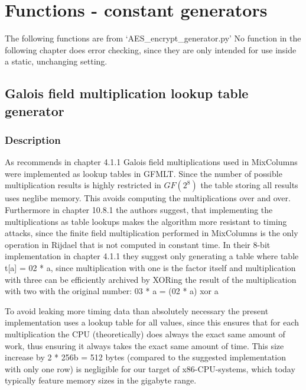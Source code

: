 
\hypertarget{functions---constant-generators}{%
\section{Functions - constant
generators}\label{functions---constant-generators}}

The following functions are from `AES\_encrypt\_generator.py' No
function in the following chapter does error checking, since they are
only intended for use inside a static, unchanging setting.

\hypertarget{galois-field-multiplication-lookup-table-generator}{%
\subsection{Galois field multiplication lookup table
generator}\label{galois-field-multiplication-lookup-table-generator}}

\hypertarget{description}{%
\subsubsection{Description}\label{description}}

As \cite{rijndael} recommends in chapter 4.1.1 Galois field multiplications
used in MixColumns were implemented as lookup tables in GFMLT. Since the
number of possible multiplication results is highly restricted in $GF(2^{8})$
the table storing all results uses neglibe memory. This avoids computing
the multiplications over and over. Furthermore in chapter 10.8.1 the
authors suggest, that implementing the multiplications as table lookups
makes the algorithm more resistant to timing attacks, since the finite
field multiplication performed in MixColumns is the only operation in
Rijdael that is not computed in constant time. In their 8-bit
implementation in chapter 4.1.1 they suggest only generating a table
where table t[a] = 02 * a, since multiplication with one is the factor
itself and multiplication with three can be efficiently archived by
XORing the result of the multiplication with two with the original
number: 03 * a = (02 * a) xor a 

To avoid leaking more timing data than
absolutely necessary the present implementation uses a lookup table for
all values, since this ensures that for each multiplication the CPU
(theoretically) does always the exact same amount of work, thus ensuring
it always takes the exact same amount of time. This size increase by 2 *
256b = 512 bytes (compared to the suggested implementation with only one
row) is negligible for our target of x86-CPU-systems, which today
typically feature memory sizes in the gigabyte range. 

